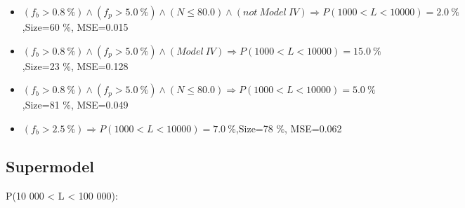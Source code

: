 \documentclass[numbered]{CSL}
\begin{document}
\begin{itemize}
\item $(f_b > 0.8~\%) \land (f_p > 5.0~\%) \land (N \leq 80.0) \land (not~Model~IV) \Rightarrow P(1 000 < L < 10 000) = 2.0~\%$,\hfill Size=60 \%, MSE=0.015
\item $(f_b > 0.8~\%) \land (f_p > 5.0~\%) \land (Model~IV) \Rightarrow P(1 000 < L < 10 000) = 15.0~\%$,\hfill Size=23 \%, MSE=0.128
\item $(f_b > 0.8~\%) \land (f_p > 5.0~\%) \land (N \leq 80.0) \Rightarrow P(1 000 < L < 10 000) = 5.0~\%$,\hfill Size=81 \%, MSE=0.049
\item $(f_b > 2.5~\%) \Rightarrow P(1 000 < L < 10 000) = 7.0~\%$,\hfill Size=78 \%, MSE=0.062
\end{itemize}

\subsection{Supermodel}
P(10 000 < L < 100 000):
\end{document}
